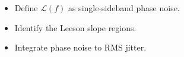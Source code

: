\begin{objectives}
\begin{itemize}[leftmargin=1.4em,itemsep=2pt]
\item Define $\mathcal{L}(f)$ as single-sideband phase noise.
\item Identify the Leeson slope regions.
\item Integrate phase noise to RMS jitter.
\end{itemize}
\end{objectives}
